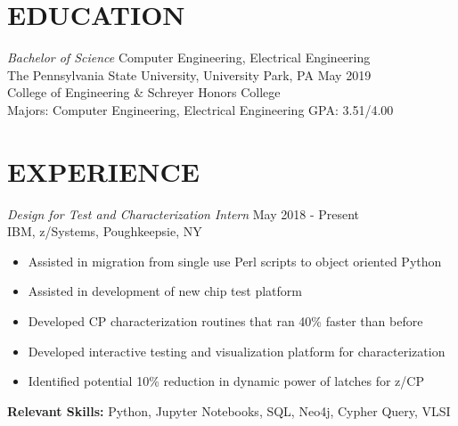 \documentclass[line,margin]{res}
\begin{document}
	\address{235 S. Buckhout St. State College, PA 16801}
	\address{(484) 904-2099}
	
	\begin{resume}
		
		
		\section{EDUCATION}{\sl Bachelor of Science} Computer Engineering, Electrical Engineering \\
		The Pennsylvania State University, University Park, PA \hfill May 2019\\
		College of Engineering \& Schreyer Honors College\\
		Majors: Computer Engineering, Electrical Engineering \hfill GPA: 3.51/4.00
		
		\section{EXPERIENCE}{\sl Design for Test and Characterization Intern} \hfill May 2018 - Present\\
		IBM, z/Systems, Poughkeepsie, NY
		\begin{itemize}  \itemsep -2pt
			\item Assisted in migration from single use Perl scripts to object oriented Python
			\item Assisted in development of new chip test platform
			\item Developed CP characterization routines that ran 40\% faster than before
			\item Developed interactive testing and visualization platform for characterization
			\item Identified potential 10\% reduction in dynamic power of latches for z/CP
			\vspace*{-\baselineskip}		
		\end{itemize}
		\textbf{Relevant Skills:} Python, Jupyter Notebooks, SQL, Neo4j, Cypher Query, VLSI
		\newline
		

\end{resume}
\end{document}
